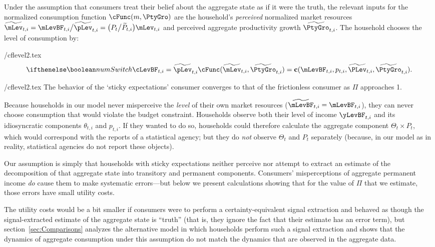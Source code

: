 \documentclass[titlepage]{\econtex}
\begin{document}
Under the assumption that consumers treat their belief about the aggregate state as if it were the truth, the relevant inputs for the normalized consumption function $\cFunc(m,\PtyGro)$ are the household's \textit{perceived} normalized market resources $\perc{\mLev}_{t,i} = \mLevBF_{t,i}\big/\perc{\pLev}_{t,i} = \big(P_t\big/\perc{P}_{t,i}\big)\mLev_{t,i}$ and perceived aggregate productivity growth $\perc{\PtyGro}_{t,i}$.  The household chooses the level of consumption by:
\begin{verbatimwrite}{\eq/cflevel2.tex}
\begin{equation*}
 \ifnumSw \cLevBF_{t,i} = \perc{\pLev}_{t,i} \cFunc(\perc{\mLev}_{t,i},\perc{\PtyGro}_{t,i}) = \cFuncLev(\mLevBF_{t,i}, p_{t,i}, \perc{\PLev}_{t,i}, \perc{\PtyGro}_{t,i}). \label{eq:cPerc}
\end{equation*}
\end{verbatimwrite}
 {\eq/cflevel2.tex}
The behavior of the `sticky expectations' consumer converges to that of the frictionless consumer as $\Pi$ approaches 1.

Because households in our model never misperceive the \textit{level} of their own market resources ($\perc{\mLevBF}_{t,i}=\mLevBF_{t,i}$), they can never choose consumption that would violate the budget constraint.  Households observe both their level of income $\yLevBF_{t,i}$ and its idiosyncratic components $\theta_{t,i}$ and ${p}_{t,i}$. If they wanted to do so, households could therefore calculate the aggregate component $\Theta_{t}\times {P}_{t}$, which would correspond with the reports of a statistical agency; but they do \textit{not} observe $\Theta_{t}$ and ${P}_{t}$ separately (because, in our model as in reality, statistical agencies do not report these objects).

Our assumption is simply that households with sticky expectations neither perceive nor attempt to extract an estimate of the decomposition of that aggregate state into transitory and permanent components.  Consumers' misperceptions of aggregate permanent income \textit{do} cause them to make systematic errors---but below we present calculations showing that for the value of $\Pi$ that we estimate, those errors have small utility costs.

The utility costs would be a bit smaller if consumers were to perform a certainty-equivalent signal extraction and behaved as though the signal-extracted estimate of the aggregate state is ``truth'' (that is, they ignore the fact that their estimate has an error term), but section~\ref{sec:Comparisons} analyzes the alternative model in which households perform such a signal extraction and shows that the dynamics of aggregate consumption under this assumption do not match the dynamics that are observed in the aggregate data.
\end{document}
